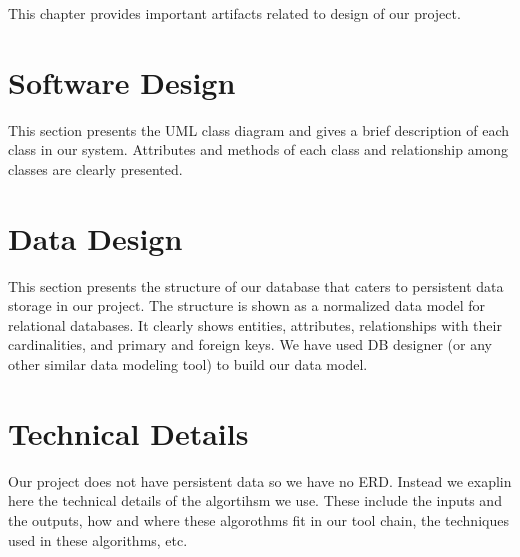 This chapter provides important artifacts related to design of our project.

\section{Software Design}

This section presents the UML class diagram and gives a brief description of each class in our system. Attributes and methods of each class and relationship among classes are clearly presented.


\section{Data Design}

This section presents the structure of our database that caters to persistent data storage in our project. The structure is shown as a normalized data model for relational databases. It clearly shows entities, attributes, relationships with their cardinalities, and primary and foreign keys. We have used DB designer (or any other similar data modeling tool) to build our data model.

 
\section{Technical Details}

Our project does not have persistent data so we have no ERD. Instead we exaplin here the technical details of the algortihsm we use. These include the inputs and the outputs, how and where these algorothms fit in our tool chain, the techniques used in these algorithms, etc.